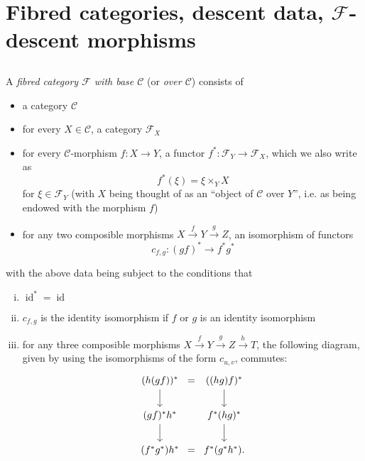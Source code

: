 \documentclass{article}
\theoremstyle{plain}
\theoremstyle{definition}
\newenvironment{definition}[1]
  {\renewcommand\theinnercustomdefinition{#1}\innercustomdefinition}
  {\endinnercustomdefinition}
\newcommand{\sh}[1]{{\mathscr{#1}}}
\newcommand{\cat}[1]{{\mathcal{#1}}}
\DeclareMathOperator{\id}{id}
\begin{document}
\section{Fibred categories, descent data, \texorpdfstring{$\sh{F}$}{F}-descent morphisms}
\label{A.1}

\subsection{}
\label{A.1.a}

\begin{definition}{1.1}
\label{definition:A.1.1}
  A \emph{fibred category $\sh{F}$ with base $\cat{C}$} (or \emph{over $\cat{C}$}) consists of
  \begin{itemize}
    \item a category $\cat{C}$
    \item for every $X\in\cat{C}$, a category $\sh{F}_X$
    \item for every $\cat{C}$-morphism $f\colon X\to Y$, a functor $f^*\colon\sh{F}_Y\to\sh{F}_X$, which we also write as
      \[
        f^*(\xi) = \xi \times_Y X
      \]
      for $\xi\in\sh{F}_Y$ (with $X$ being thought of as an ``object of $\cat{C}$ over $Y$'', i.e. as being endowed with the morphism $f$)
    \item for any two composible morphisms $X\xrightarrow{f}Y\xrightarrow{g}Z$, an isomorphism of functors
      \[
        c_{f,g}\colon (gf)^* \to f^*g^*
      \]
  \end{itemize}
  with the above data being subject to the conditions that
  \begin{enumerate}[(i)]
    \item $\id^*=\id$
    \item $c_{f,g}$ is the identity isomorphism if $f$ or $g$ is an identity isomorphism
    \item for any three composible morphisms $X\xrightarrow{f}Y\xrightarrow{g}Z\xrightarrow{h}T$, the following diagram, given by using the isomorphisms of the form $c_{u,v}$, commutes:
      \[
        \begin{tikzcd}[column sep=0]
          (h(gf))^* \dar &=& ((hg)f)^* \dar
        \\(gf)^*h^* \dar && f^*(hg)^* \dar
        \\(f^*g^*)h^* &=& f^*(g^*h^*).
        \end{tikzcd}
      \]
  \end{enumerate}
\end{definition}
\end{document}
